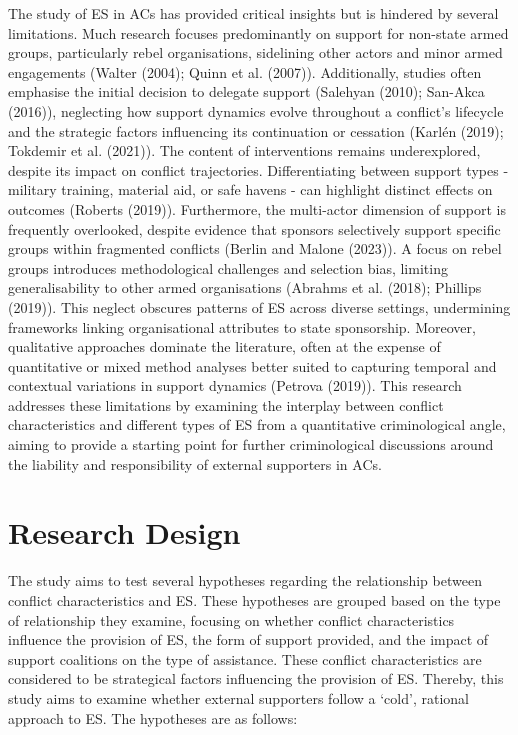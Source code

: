 \documentclass[
]{article}
\begin{document}
The study of ES in ACs has provided critical insights but is hindered by
several limitations. Much research focuses predominantly on support for
non-state armed groups, particularly rebel organisations, sidelining
other actors and minor armed engagements (Walter (2004); Quinn et al.
(2007)). Additionally, studies often emphasise the initial decision to
delegate support (Salehyan (2010); San-Akca (2016)), neglecting how
support dynamics evolve throughout a conflict's lifecycle and the
strategic factors influencing its continuation or cessation (Karlén
(2019); Tokdemir et al. (2021)). The content of interventions remains
underexplored, despite its impact on conflict trajectories.
Differentiating between support types - military training, material aid,
or safe havens - can highlight distinct effects on outcomes (Roberts
(2019)). Furthermore, the multi-actor dimension of support is frequently
overlooked, despite evidence that sponsors selectively support specific
groups within fragmented conflicts (Berlin and Malone (2023)). A focus
on rebel groups introduces methodological challenges and selection bias,
limiting generalisability to other armed organisations (Abrahms et al.
(2018); Phillips (2019)). This neglect obscures patterns of ES across
diverse settings, undermining frameworks linking organisational
attributes to state sponsorship. Moreover, qualitative approaches
dominate the literature, often at the expense of quantitative or mixed
method analyses better suited to capturing temporal and contextual
variations in support dynamics (Petrova (2019)). This research addresses
these limitations by examining the interplay between conflict
characteristics and different types of ES from a quantitative
criminological angle, aiming to provide a starting point for further
criminological discussions around the liability and responsibility of
external supporters in ACs.

\section{Research Design}\label{research-design}

The study aims to test several hypotheses regarding the relationship
between conflict characteristics and ES. These hypotheses are grouped
based on the type of relationship they examine, focusing on whether
conflict characteristics influence the provision of ES, the form of
support provided, and the impact of support coalitions on the type of
assistance. These conflict characteristics are considered to be
strategical factors influencing the provision of ES. Thereby, this study
aims to examine whether external supporters follow a `cold', rational
approach to ES. The hypotheses are as follows:
\end{document}
